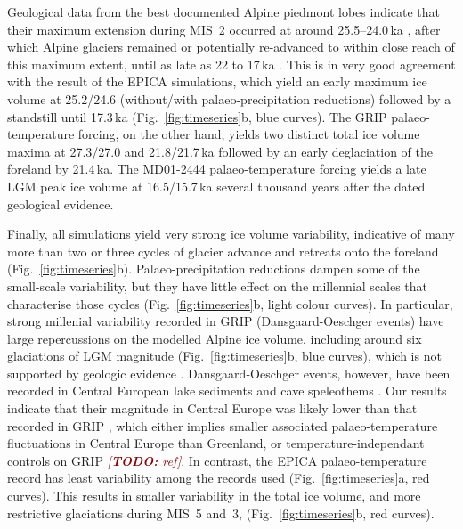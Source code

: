 \documentclass[tc, manuscript]{copernicus}
\newcommand{\todo}[1]{\textcolor{darkred}{\emph{[\textbf{TODO:} #1]}}}
\begin{document}
    Geological data from the best documented Alpine piedmont lobes indicate
    that their maximum extension during MIS~2 occurred at around 25.5--24.0\,ka
    \citep{Monegato.etal.2017}, after which Alpine glaciers remained or
    potentially re-advanced to within close reach of this maximum extent, until
    as late as 22 to 17\,ka \citep[Fig.~5]{Wirsig.etal.2016}. This is in very
    good agreement with the result of the EPICA simulations, which yield an
    early maximum ice volume at 25.2/24.6 (without/with palaeo-precipitation
    reductions) followed by a standstill until 17.3\,ka
    (Fig.~\ref{fig:timeseries}b, blue curves). The GRIP palaeo-temperature
    forcing, on the other hand, yields two distinct total ice volume maxima
    at 27.3/27.0 and 21.8/21.7\,ka followed by an early deglaciation of the
    foreland by 21.4\,ka. The MD01-2444 palaeo-temperature forcing yields
    a late LGM peak ice volume at 16.5/15.7\,ka several thousand years after
    the dated geological evidence.

    Finally, all simulations yield very strong ice volume
    variability, indicative of many more than two or three cycles of glacier
    advance and retreats onto the foreland (Fig.~\ref{fig:timeseries}b).
    Palaeo-precipitation reductions dampen some of the small-scale variability,
    but they have little effect on the millennial scales that characterise
    those cycles (Fig.~\ref{fig:timeseries}b, light colour curves). In
    particular, strong millenial variability recorded in GRIP
     (Dansgaard-Oeschger events) have large repercussions
    on the modelled Alpine ice volume, including around six glaciations of LGM
    magnitude (Fig.~\ref{fig:timeseries}b, blue curves), which is not supported
    by geologic evidence \citep{Preusser.2004, Ivy-Ochs.etal.2008}.
    Dansgaard-Oeschger events, however, have been recorded in Central European
    lake sediments \citep{Wohlfarth.etal.2008} and cave speleothems
    \citep{Spotl.Mangini.2002, Luetscher.etal.2015}. Our results indicate that
    their magnitude in Central Europe was likely lower than that recorded in
    GRIP , which either implies smaller associated
    palaeo-temperature fluctuations in Central Europe than Greenland, or
    temperature-independant controls on GRIP 
    \todo{ref}. In contrast,
    the EPICA palaeo-temperature record has least variability among the records
    used (Fig.~\ref{fig:timeseries}a, red curves). This results in smaller
    variability in the total ice volume, and more restrictive glaciations
    during MIS~5 and~3, (Fig.~\ref{fig:timeseries}b, red curves).
\end{document}
